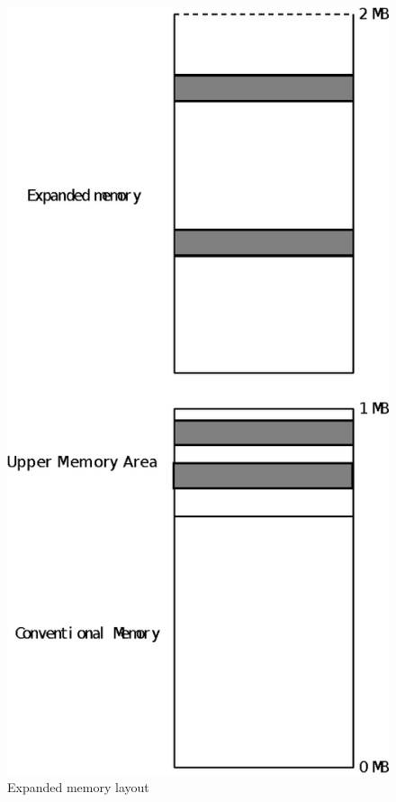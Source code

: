 \documentclass[book.tex]{subfiles}
\begin{document}
\begin{figure}[H]
\centering
\includegraphics[scale=1]{imgs/expanded_ram.eps}
\caption{Expanded memory layout}
\label{fig:em_layout}
\end{figure}
\end{document}
